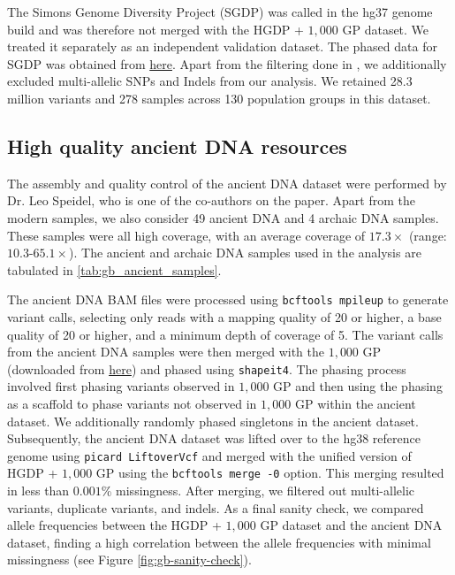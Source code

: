 The Simons Genome Diversity Project (SGDP) was called in the hg37 genome build and was therefore not merged with the HGDP + $1{,}000$ GP dataset.
%
We treated it separately as an independent validation dataset.
%
The phased data for SGDP was obtained from \href{https://sharehost.hms.harvard.edu/genetics/reich_lab/sgdp/phased_data.knownbugs.not_recommended.please_use_newer_dataset_instead/}{here}.
%
Apart from the filtering done in \cite{mallick2016simons}, we additionally excluded multi-allelic SNPs and Indels from our analysis.
%
We retained 28.3 million variants and 278 samples across 130 population groups in this dataset.

\subsection{High quality ancient DNA resources}

The assembly and quality control of the ancient DNA dataset were performed by Dr. Leo Speidel, who is one of the co-authors on the paper.
%
Apart from the modern samples, we also consider 49 ancient DNA and 4 archaic DNA samples. These samples were all high coverage, with an average coverage of $17.3\times$ (range: $10.3$-$65.1 \times$). The ancient and archaic DNA samples used in the analysis are tabulated in \ref{tab:gb_ancient_samples}.

The ancient DNA BAM files were processed using \texttt{bcftools mpileup} to generate variant calls, selecting only reads with a mapping quality of 20 or higher, a base quality of 20 or higher, and a minimum depth of coverage of 5.
%
The variant calls from the ancient DNA samples were then merged with the $1{,}000$ GP (downloaded from \href{https://ftp.1000genomes.ebi.ac.uk/vol1/ftp/release/20130502/}{here}) and phased using \texttt{shapeit4}. The phasing process involved first phasing variants observed in $1{,}000$ GP and then using the phasing as a scaffold to phase variants not observed in $1{,}000$ GP within the ancient dataset. We additionally randomly phased singletons in the ancient dataset.
%
Subsequently, the ancient DNA dataset was lifted over to the hg38 reference genome using \texttt{picard LiftoverVcf} and merged with the unified version of HGDP + $1{,}000$ GP using the \texttt{bcftools merge -0} option. This merging resulted in less than $0.001$\% missingness. After merging, we filtered out multi-allelic variants, duplicate variants, and indels. As a final sanity check, we compared allele frequencies between the HGDP + $1{,}000$ GP dataset and the ancient DNA dataset, finding a high correlation between the allele frequencies with minimal missingness (see Figure \ref{fig:gb-sanity-check}).

